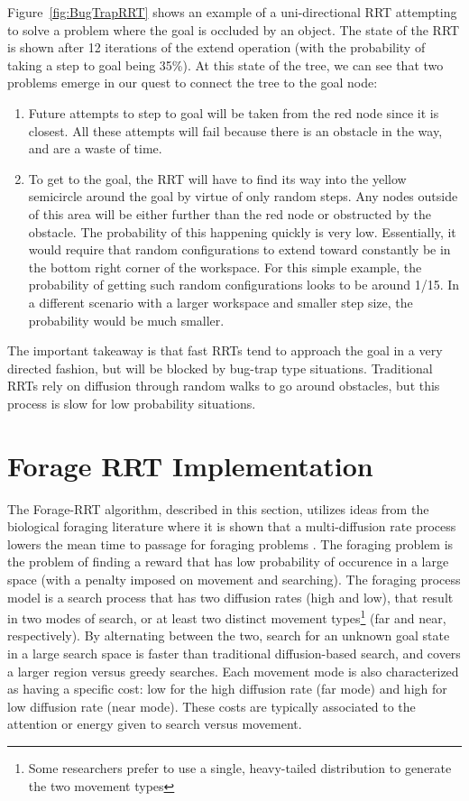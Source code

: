 \documentclass[conference]{IEEEtran}
\begin{document}
Figure~\ref{fig:BugTrapRRT} shows an example of a uni-directional RRT 
attempting to solve a problem where the goal is occluded by an object.  The
state of the RRT is shown after 12 iterations of the extend operation (with
the probability of taking a step to goal being 35\%). At this state of the
tree, we can see that two problems emerge in our quest to connect the tree 
to the goal node:
\begin{enumerate}
\item Future attempts to step to goal will be taken from the red node since it is closest. All these attempts will fail because there is an
obstacle in the way, and are a waste of time.
\item To get to the goal, the RRT will have to find its way into the yellow
semicircle around the goal by virtue of only random steps. Any nodes outside
of this area will be either further than the red node or obstructed by the
obstacle. The probability of this happening quickly is very low.
Essentially, it would require that random configurations to extend toward
constantly be in the bottom right
corner of the workspace. For this simple example, the probability of getting
such random configurations looks to be around 1/15. In a different scenario
with a larger workspace and smaller step size, the probability would be
much smaller. 
\end{enumerate}

The important takeaway is that fast RRTs tend to approach the goal in a very 
directed fashion, but will be blocked by bug-trap type situations.  
Traditional RRTs rely on diffusion through random walks to go around
obstacles, but this process is slow for low probability situations.

\section{Forage RRT Implementation}
\label{sec:implementation}

The Forage-RRT algorithm, described in this section, utilizes ideas
from the biological foraging literature where it is shown that a
multi-diffusion rate process lowers the mean time to passage for foraging
problems \CITE.  The foraging problem is the problem of finding a reward
that has low probability of occurence in a large space (with a penalty
imposed on
movement and searching).  The foraging process model is a search process
that has two diffusion rates (high and low), that result in two modes of
search, or at least two distinct movement types\footnote{Some researchers
prefer to use a single, heavy-tailed distribution to generate the two
movement types \CITE} (far and near, respectively).  By alternating between
the two, search for an unknown goal state in a large search space is faster
than traditional diffusion-based search, and covers a larger region versus
greedy searches.  Each movement mode is also characterized as having a
specific cost: low for the high diffusion rate (far mode) and high for low
diffusion rate (near mode).  These costs are typically associated to the
attention or energy given to search versus movement. 
\end{document}
